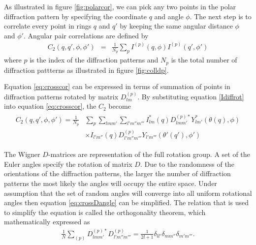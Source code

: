 As illustrated in figure \ref{fig:polarcor}, we can pick any two points in the polar diffraction pattern by specifying the coordinate $q$ and angle $\phi$.  The next step is to correlate every point in rings $q$ and $q'$ by keeping the same angular distance  $\phi$ and $\phi'$. Angular pair correlations are defined by
\begin{eqnarray}
C_{2}(q,q',\phi,\phi') &=& \frac{1}{N_{p}} \sum_{p} I^{(p)}(q,\phi) I^{(p)}(q',\phi') 
\label{eq:crosscor}
\end{eqnarray}
where $p$ is the index of the diffraction patterns and $N_p$ is the total number of diffraction pattterns as illustrated in figure \ref{fig:colldp}.

Equation \ref{eq:crosscor} can be expressed in terms of summation of points in diffraction patterns rotated by matrix $D^{(p)}_{lm}$. By substituting equation \ref{Idiffrot} into equation \ref{eq:crosscor}, the $C_{2}$ become
\begin{align}
\begin{split}
C_{2}(q,q',\phi,\phi') = \frac{1}{N_{p}} &  \sum_{p} \sum_{lmm'} \sum_{l'm''m'''}I^{*}_{lm}(q) D^{(p)*}_{lmm'} Y^{*}_{lm'}(\theta(q),\phi) \\
&\times I_{l'm''}(q) D^{(p)}_{l'm''m'''} Y_{l'm'''}(\theta'(q'),\phi') 
\label{eq:crossDangle}
\end{split}
\end{align}

The Wigner $D$-matrices are representation of the full rotation group. A set of the Euler angles specify the rotation of matrix $D$. Due to the randomness of the orientations of the diffraction patterns, the larger the number of diffraction patterns the most likely the angles will occupy the entire space. Under assumption that the set of random angles will converge into all uniform rotational angles then equation \ref{eq:crossDangle} can be simplified. The relation that is used to simplify the equation is called the orthogonality theorem, which mathematically expressed as
\begin{eqnarray}
\frac{1}{N} \sum_{(p)} D^{(p)*}_{lmm'} D^{(p)}_{l'm''m'''}=\frac{1}{2l+1} \delta_{ll'} \delta_{mm''} \delta_{m'm'''}.
\label{eq:orthotheorem}
\end{eqnarray}


